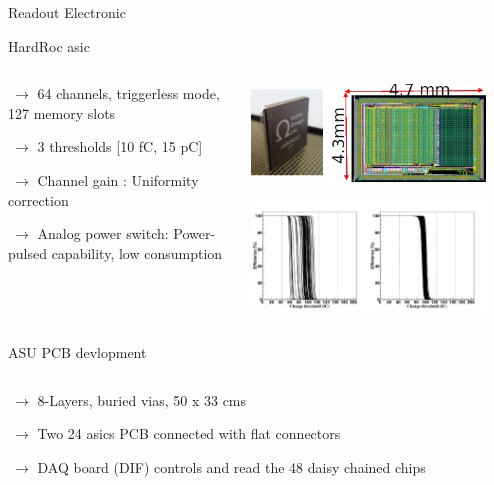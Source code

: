 \documentclass[10pt]{beamer}
\begin{document}
\begin{frame}[shrink=3]{Readout Electronic}
  \begin{block}{HardRoc asic}
    \begin{columns}
      \begin{column}{0.5\textwidth}
        {\small 
          \par $ ~ \rightarrow$ 64 channels, triggerless mode, 127 memory slots
          \par $ ~\rightarrow$  3 thresholds [10 fC,  15 pC]
          \par $ ~\rightarrow$  Channel gain : Uniformity correction
          \par $ ~\rightarrow$  Analog power switch: Power-pulsed capability, low consumption

        }
      \end{column}

      \begin{column}{0.5\textwidth}
        \centerline{\includegraphics[width=0.9\textwidth]{jpg/HR2Chip}}
        \centerline{\includegraphics[width=0.9\textwidth]{jpg/HR2GainAdjustement}}
      \end{column}

    \end{columns}
  \end{block}
  \pause
  \begin{block}{ASU PCB devlopment}
    \begin{columns}
      \begin{column}{0.5\textwidth}
        {\small 
          \par $ ~ \rightarrow$ 8-Layers, buried vias, 50 x 33 cms
          \par $ ~\rightarrow$  Two 24 asics PCB connected with flat connectors
          \par $ ~\rightarrow$  DAQ board (DIF) controls and read the 48 daisy chained chips
        }
      \end{column}


\end{columns}
\end{block}
\end{frame}
\end{document}
